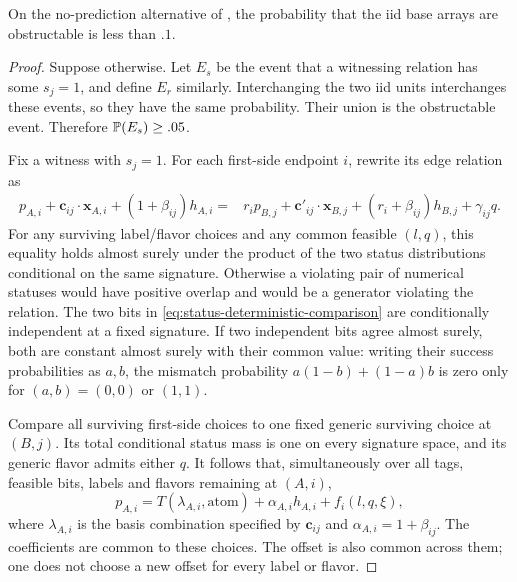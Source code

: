 \begin{lemma}
\label{lem:status-global-prediction}
On the no-prediction alternative of , the
probability that the iid base arrays are obstructable is less than $.1$.
\end{lemma}

\begin{proof}
Suppose otherwise. Let $E_s$ be the event that a witnessing relation
has some $s_j=1$, and define $E_r$ similarly. Interchanging the two iid
units interchanges these events, so they have the same probability.
Their union is the obstructable event. Therefore
$\mathbb P(E_s)\ge .05$.

Fix a witness with $s_j=1$. For each first-side endpoint $i$, rewrite
its edge relation as
\begin{align}
p_{A,i}+\mathbf c_{ij}\cdot\mathbf x_{A,i}
                 +(1+\beta_{ij})h_{A,i}
={}&r_i p_{B,j}+\mathbf c'_{ij}\cdot\mathbf x_{B,j}
                 +(r_i+\beta_{ij})h_{B,j}+\gamma_{ij}q.
\label{eq:status-deterministic-comparison}
\end{align}
For any surviving label/flavor choices and any common feasible $(l,q)$,
this equality holds almost surely under the product of the two status
distributions conditional on the same signature. Otherwise a violating
pair of numerical statuses would have positive overlap and would be a
generator violating the relation. The two bits in
\eqref{eq:status-deterministic-comparison} are conditionally independent
at a fixed signature. If two independent bits agree almost surely, both
are constant almost surely with their common value: writing their
success probabilities as $a,b$, the mismatch probability
$a(1-b)+(1-a)b$ is zero only for $(a,b)=(0,0)$ or $(1,1)$.

Compare all surviving first-side choices to one fixed generic surviving
choice at $(B,j)$. Its total conditional status mass is one on every
signature space, and its generic flavor admits either $q$. It follows
that, simultaneously over all tags, feasible bits, labels and flavors
remaining at $(A,i)$,
\begin{equation}
\label{eq:status-extracted-prediction}
p_{A,i}=T(\lambda_{A,i},\mathrm{atom})+\alpha_{A,i}h_{A,i}
                    +f_i(l,q,\xi),
\end{equation}
where $\lambda_{A,i}$ is the basis combination specified by
$\mathbf c_{ij}$ and $\alpha_{A,i}=1+\beta_{ij}$. The coefficients
are common to these choices. The offset is also common across them;
one does not choose a new offset for every label or flavor.


\end{proof}
